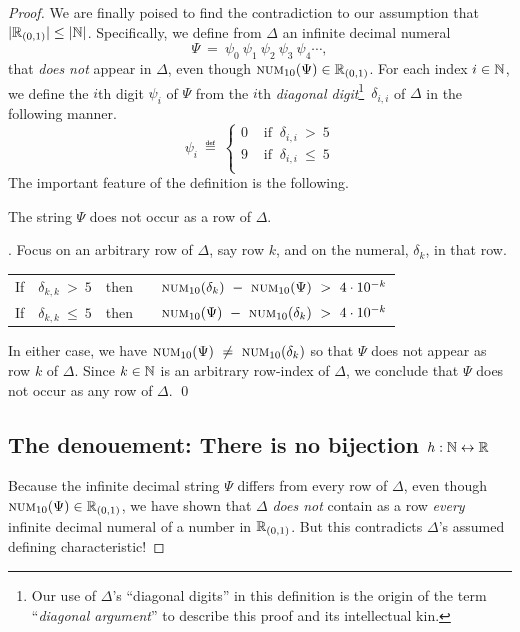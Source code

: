 \begin{proof}
We are finally poised to find the contradiction to our assumption that
$|\mathbb{R}_{(0,1)}| \leq |\mathbb{N}|$.  Specifically, we define from $\Delta$ an
infinite decimal numeral
\[ \Psi \ = \ \psi_0 \ \psi_1 \ \psi_2 \ \psi_3 \ \psi_4 \cdots, \]
that {\em does not} appear in $\Delta$, even though $\mbox{\sc
  num}_{10}(\Psi) \in \mathbb{R}_{(0,1)}$.  For each index $i \in \mathbb{N}$, we
define the $i$th digit $\psi_i$ of $\Psi$ from the $i$th {\em diagonal
  digit}\footnote{Our use of $\Delta$'s ``diagonal digits'' in this
  definition is the origin of the term ``{\em diagonal argument}'' to
  describe this proof and its intellectual kin.}~$\delta_{i,i}$ of
$\Delta$ in the following manner.
\[ \psi_i \ \eqdef \
\left\{
\begin{array}{cc}
0 & \mbox{ if } \ \delta_{i,i} \ > \ 5 \\
9 & \mbox{ if } \ \delta_{i,i} \ \leq \ 5 \\
\end{array}
\right.
\]
The important feature of the definition is the following.

\begin{lemma}
\label{lem:PSI-notin-DELTA}
The string $\Psi$ does not occur as a row of $\Delta$.
\end{lemma}

.
Focus on an arbitrary row of $\Delta$, say row $k$, and on the numeral,
$\delta_k$, in that row.

\begin{tabular}{lclc}
If & $\delta_{k,k} \ > \ 5$ & then & \ \
$\mbox{\sc num}_{10}(\delta_k) \ - \ \mbox{\sc num}_{10}(\Psi) \ > \ 4
\cdot 10^{-k}$ \\
If & $\delta_{k,k} \ \leq \ 5$ & then & \ \
$\mbox{\sc num}_{10}(\Psi) \ - \ \mbox{\sc num}_{10}(\delta_k) \ > \ 4
\cdot 10^{-k}$
\end{tabular}

\noindent
In either case, we have $\mbox{\sc num}_{10}(\Psi) \ \neq \ \mbox{\sc
  num}_{10}(\delta_k)$ so that $\Psi$ does not appear as row $k$ of
$\Delta$.  Since $k \in \mathbb{N}$ is an arbitrary row-index of $\Delta$, we
conclude that $\Psi$ does not occur as any row of $\Delta$.  \qed

\subsection{The denouement: There is no bijection  $h: \mathbb{N} \leftrightarrow \mathbb{R}$}

Because the infinite decimal string $\Psi$ differs from every row of
$\Delta$, even though $\mbox{\sc num}_{10}(\Psi) \in \mathbb{R}_{(0,1)}$, we have
shown that $\Delta$ {\em does not} contain as a row {\em every}
infinite decimal numeral of a number in $\mathbb{R}_{(0,1)}$.  But this
contradicts $\Delta$'s assumed defining characteristic!


\end{proof}
